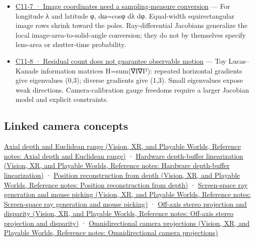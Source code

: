 \begin{itemize}
\item
  \hyperref[02-foundations-ii-ch035-figure-c11-7-image-coordinates-need-a-sampling-measure-conversion]{C11-7 · Image coordinates need a sampling-measure conversion} --- For longitude λ and latitude φ, dω=cosφ dλ dφ. Equal-width equirectangular image rows shrink toward the poles. Ray-differential Jacobians generalize the local image-area-to-solid-angle conversion; they do not by themselves specify lens-area or shutter-time probability.
\item
  \hyperref[02-foundations-ii-ch035-figure-c11-8-residual-count-does-not-guarantee-observable-motion]{C11-8 · Residual count does not guarantee observable motion} --- Toy Lucas--Kanade information matrices H=sum(∇I∇Iᵀ): repeated horizontal gradients give eigenvalues (0,3); diverse gradients give (1,3). Small eigenvalues expose weak directions. Camera-calibration gauge freedoms require a larger Jacobian model and explicit constraints.
\end{itemize}

\subsection{Linked camera concepts}\label{appendix-a2b71a18f5a2-linked-camera-concepts}

\href{../07-Vision-XR-and-Playable-Worlds/main.pdf\#nameddest=appendix-cac01ebeeb11}{Axial depth and Euclidean range (Vision, XR, and Playable Worlds, Reference notes: Axial depth and Euclidean range)} · \href{../07-Vision-XR-and-Playable-Worlds/main.pdf\#nameddest=appendix-1bc40b08db4a}{Hardware depth-buffer linearization (Vision, XR, and Playable Worlds, Reference notes: Hardware depth-buffer linearization)} · \href{../07-Vision-XR-and-Playable-Worlds/main.pdf\#nameddest=appendix-2cbf2968e866}{Position reconstruction from depth (Vision, XR, and Playable Worlds, Reference notes: Position reconstruction from depth)} · \href{../07-Vision-XR-and-Playable-Worlds/main.pdf\#nameddest=appendix-f1a6d43e80d1}{Screen-space ray generation and mouse picking (Vision, XR, and Playable Worlds, Reference notes: Screen-space ray generation and mouse picking)} · \href{../07-Vision-XR-and-Playable-Worlds/main.pdf\#nameddest=appendix-0976e86e5b9f}{Off-axis stereo projection and disparity (Vision, XR, and Playable Worlds, Reference notes: Off-axis stereo projection and disparity)} · \href{../07-Vision-XR-and-Playable-Worlds/main.pdf\#nameddest=appendix-fc99ad39f351}{Omnidirectional camera projections (Vision, XR, and Playable Worlds, Reference notes: Omnidirectional camera projections)}

